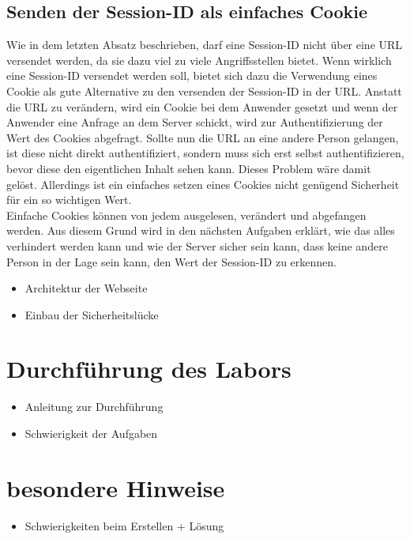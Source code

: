 \subsection{Senden der Session-ID als einfaches Cookie}
Wie in dem letzten Absatz beschrieben, darf eine Session-ID nicht über eine URL versendet werden, da sie dazu viel zu viele Angriffsstellen bietet. Wenn wirklich eine Session-ID versendet werden soll, bietet sich dazu die Verwendung eines Cookie als gute Alternative zu den versenden der Session-ID in der URL. Anstatt die URL zu verändern, wird ein Cookie bei dem Anwender gesetzt und wenn der Anwender eine Anfrage an dem Server schickt, wird zur Authentifizierung der Wert des Cookies abgefragt. Sollte nun die URL an eine andere Person gelangen, ist diese nicht direkt authentifiziert, sondern muss sich erst selbst authentifizieren, bevor diese den eigentlichen Inhalt sehen kann. Dieses Problem wäre damit gelöst. Allerdings ist ein einfaches setzen eines Cookies nicht genügend Sicherheit für ein so wichtigen Wert. \\
Einfache Cookies können von jedem ausgelesen, verändert und abgefangen werden. Aus diesem Grund wird in den nächsten Aufgaben erklärt, wie das alles verhindert werden kann und wie der Server sicher sein kann, dass keine andere Person in der Lage sein kann, den Wert der Session-ID zu erkennen.
\begin{itemize}
	\item Architektur der Webseite
	\item Einbau der Sicherheitslücke
\end{itemize}
\section{Durchführung des Labors}
\begin{itemize}
	\item Anleitung zur Durchführung 
	\item Schwierigkeit der Aufgaben
	
\end{itemize}
\section{besondere Hinweise}
\begin{itemize}
	\item Schwierigkeiten beim Erstellen + Lösung
\end{itemize}
